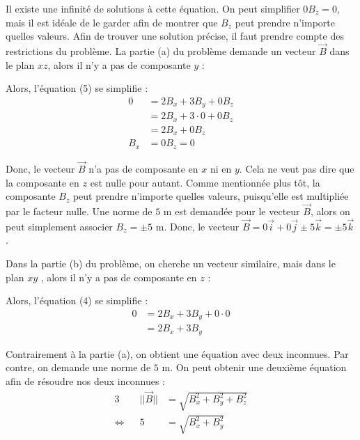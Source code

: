 \documentclass[11pt]{article}
\begin{document}
Il existe une infinité de solutions à cette équation. On peut simplifier $0B_z=0$, mais il est idéale de le garder afin de montrer que $B_z$ peut prendre n'importe quelles valeurs. Afin de trouver une solution précise, il faut prendre compte des restrictions du problème. La partie (a) du problème demande un vecteur $\vec{B}$ dans le plan $xz$, alors il n'y a pas de composante $y$ :

\begin{center}

\end{center}

Alors, l'équation (5) se simplifie :
\begin{equation*}
\begin{split}
 0 &= 2B_x+3B_y+0B_z\\
   &= 2B_x+3\cdot 0+0B_z\\
   &= 2B_x+0B_z\\
B_x&= 0B_z = 0
\end{split}
\end{equation*}

Donc, le vecteur $\vec{B}$ n'a pas de composante en $x$ ni en $y$. Cela ne veut pas dire que la composante en $z$ est nulle pour autant. Comme mentionnée plus tôt, la composante $B_z$ peut prendre n'importe quelles valeurs, puisqu'elle est multipliée par le facteur nulle. Une norme de $5\text{ m}$ est demandée pour le vecteur $\vec{B}$, alors on peut simplement associer $B_z=\pm5\text{ m}$. Donc, le vecteur $\vec{B} = 0\vec{i}+0\vec{j}\pm5\vec{k}=\pm5\vec{k}$.\\
\pagebreak

Dans la partie (b) du problème, on cherche un vecteur similaire, mais dans le plan $xy$ , alors il n'y a pas de composante en $z$ :

\begin{center}

\end{center}

Alors, l'équation (4) se simplifie :
\begin{equation}
\begin{split}
 0 &= 2B_x+3B_y+0\cdot 0\\
   &= 2B_x+3B_y
\end{split}
\end{equation}

Contrairement à la partie (a), on obtient une équation avec deux inconnues. Par contre, on demande une norme de $5\text{ m}$. On peut obtenir une deuxième équation afin de résoudre nos deux inconnues :
\begin{alignat*}{3}
                & & ||\vec{B}|| &= \sqrt{B_x^2+B_y^2+B_z^2}\\
\Leftrightarrow & &           5 &= \sqrt{B_x^2+B_y^2}
\end{alignat*}
\end{document}
